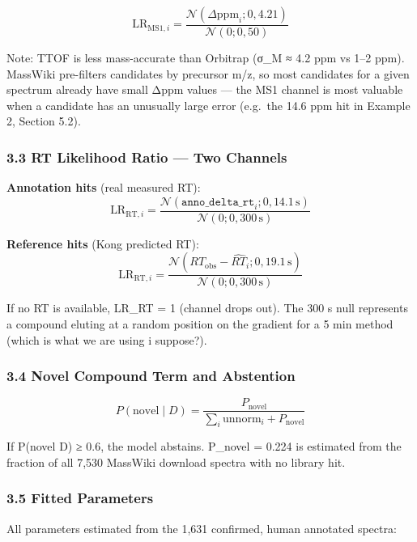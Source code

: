\[\text{LR}_{\text{MS1},i} = \frac{\mathcal{N}(\Delta\text{ppm}_i; 0, 4.21)}{\mathcal{N}(0; 0, 50)}\]

Note: TTOF is less mass-accurate than Orbitrap (σ\_M ≈ 4.2 ppm vs 1--2
ppm). MassWiki pre-filters candidates by precursor m/z, so most
candidates for a given spectrum already have small Δppm values --- the
MS1 channel is most valuable when a candidate has an unusually large
error (e.g.~the 14.6 ppm hit in Example 2, Section 5.2).

\subsubsection{3.3 RT Likelihood Ratio --- Two
Channels}\label{rt-likelihood-ratio-two-channels}

\textbf{Annotation hits} (real measured RT):
\[\text{LR}_{\text{RT},i} = \frac{\mathcal{N}(\texttt{anno\_delta\_rt}_i; 0, 14.1\,\text{s})}{\mathcal{N}(0; 0, 300\,\text{s})}\]

\textbf{Reference hits} (Kong predicted RT):
\[\text{LR}_{\text{RT},i} = \frac{\mathcal{N}(RT_{\text{obs}} - \widehat{RT}_i; 0, 19.1\,\text{s})}{\mathcal{N}(0; 0, 300\,\text{s})}\]

If no RT is available, LR\_RT = 1 (channel drops out). The 300 s null
represents a compound eluting at a random position on the gradient for a
5 min method (which is what we are using i suppose?).

\subsubsection{3.4 Novel Compound Term and
Abstention}\label{novel-compound-term-and-abstention}

\[P(\text{novel} \mid D) = \frac{P_{\text{novel}}}{\sum_i \text{unnorm}_i + P_{\text{novel}}}\]

If P(novel \textbar{} D) ≥ 0.6, the model abstains. P\_novel = 0.224 is
estimated from the fraction of all 7,530 MassWiki download spectra with
no library hit.

\subsubsection{3.5 Fitted Parameters}\label{fitted-parameters}

All parameters estimated from the 1,631 confirmed, human annotated
spectra:

